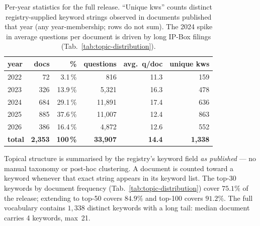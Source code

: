 \begin{table}[!htb]
\centering
\footnotesize
\begin{tabular}{@{}lrrrrr@{}}
\toprule
\textbf{year} & \textbf{docs} & \textbf{\%} & \textbf{questions} & \textbf{avg.\ q/doc} & \textbf{unique kws} \\
\midrule
2022 &    72 &   3.1\,\%  &    816 & 11.3 &  159 \\
2023 &   326 &  13.9\,\% &  5{,}321 & 16.3 &  478 \\
2024 &   684 &  29.1\,\% & 11{,}891 & 17.4 &  636 \\
2025 &   885 &  37.6\,\% & 11{,}007 & 12.4 &  863 \\
2026 &   386 &  16.4\,\% &  4{,}872 & 12.6 &  552 \\
\midrule
\textbf{total} & \textbf{2{,}353} & \textbf{100\,\%} & \textbf{33{,}907} & \textbf{14.4} & \textbf{1{,}338} \\
\bottomrule
\end{tabular}
\caption{Per-year statistics for the full release. ``Unique kws''
counts distinct registry-supplied keyword strings observed in
documents published that year (any year-membership; rows do not sum).
The 2024 spike in average questions per document is driven by long
IP-Box filings (Tab.~\ref{tab:topic-distribution}).}
\label{tab:per-year}
\end{table}

Topical structure is summarised by the registry's keyword field
\textit{as published} --- no manual taxonomy or post-hoc clustering.
A document is counted toward a keyword whenever that exact string
appears in its keyword list. The top-30 keywords by document
frequency (Tab.~\ref{tab:topic-distribution}) cover $75.1\%$ of the
release; extending to top-50 covers $84.9\%$ and top-100 covers
$91.2\%$. The full vocabulary contains $1{,}338$ distinct keywords
with a long tail: median document carries 4 keywords, max~21.

